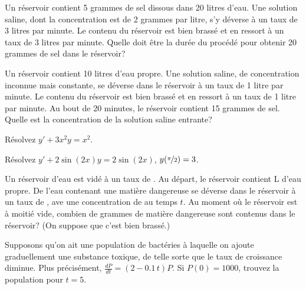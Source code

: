 \begin{exercise}
Un réservoir contient 5 grammes de sel dissous dans 20 litres d'eau.  Une solution saline, dont la concentration est de 2 grammes par litre, s'y déverse à un taux de 3 litres par minute.  Le contenu du réservoir est bien brassé et en ressort à un taux de 3 litres par minute. Quelle doit être la durée du procédé pour obtenir 20 grammes de sel dans le réservoir?
\end{exercise}

\begin{exercise}
Un réservoir contient 10 litres d'eau propre.  Une solution saline, de concentration inconnue mais constante, se déverse dans le réservoir à un taux de 1 litre par minute.  Le contenu du réservoir est bien brassé et en ressort à un taux de 1 litre par minute.  Au bout de 20 minutes, le réservoir contient 15 grammes de sel.  Quelle est la concentration de la solution saline entrante?
\end{exercise}

\setcounter{exercise}{100}

\begin{exercise}
Résolvez $y'+3 x^2 y = x^2$.
\end{exercise}

\begin{exercise}
Résolvez $y'+ 2\sin(2x) y = 2\sin(2x)$, $y(\nicefrac{\pi}{2}) = 3$.
\end{exercise}

\begin{exercise}
Un réservoir d'eau est vidé à un taux de .  Au départ, le réservoir contient \unit[10]{L} d'eau propre.  De l'eau contenant une matière dangereuse se déverse dans le réservoir à un taux de ,
ave une concentration de  au temps $t$.
Au moment où le réservoir est à moitié vide, combien de grammes de matière dangereuse sont contenus dans le réservoir?  (On suppose que c'est bien brassé.)
\end{exercise}

\begin{exercise}
Supposons qu'on ait une population de bactéries à laquelle on ajoute graduellement une substance toxique, de telle sorte que le taux de croissance diminue.  Plus précisément, $\frac{dP}{dt} = (2-0.1\,t)P$.  Si $P(0) = 1000$, trouvez la population pour $t=5$.
\end{exercise}

